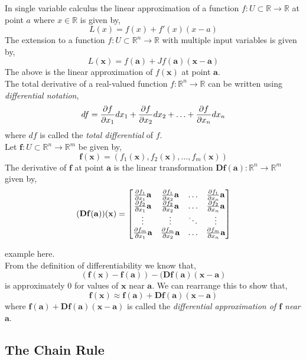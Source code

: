 \documentclass[12pt]{article}
\begin{document}
 In single variable calculus the linear approximation of a function $f:U\subset\mathbb{R}\rightarrow\mathbb{R}$ at point $a$ where $x\in\mathbb{R}$ is given by,
\[
L(x) = f(x) + f'(x)(x-a)
\]
The extension to a function $f:U\subset\mathbb{R}^n\rightarrow\mathbb{R}$ with multiple input variables is given by,
\[
L(\mathbf{x}) = f(\mathbf{a}) + Jf(\mathbf{a})(\mathbf{x}-\mathbf{a})
\]
The above is the linear approximation of $f(\mathbf{x})$ at point $\mathbf{a}$. \\

 The total derivative of a real-valued function $f:\mathbb{R}^n\rightarrow\mathbb{R}$  can be written using \emph{differential notation},
\[
df = \frac{\partial f}{\partial x_1}dx_1 + \frac{\partial f}{\partial x_2}dx_2 + \ldots + \frac{\partial f}{\partial x_n}dx_n
\]
where $df$ is called the \emph{total differential} of $f$. \\

 Let $\mathbf{f}:U\subset\mathbb{R}^n\rightarrow\mathbb{R}^m$ be given by,
\[
\mathbf{f}(\mathbf{x}) = (f_1(\mathbf{x}),f_2(\mathbf{x}),\ldots,f_m(\mathbf{x}))
\]
The derivative of $\mathbf{f}$ at point $\mathbf{a}$ is the linear transformation $\mathbf{Df(a)}:\mathbb{R}^n\rightarrow\mathbb{R}^m$ given by,
\[
\mathbf{(Df(a))(x)} = 
\begin{bmatrix}
\frac{\partial f_1}{\partial x_1}\mathbf{a} & \frac{\partial f_1}{\partial x_2}\mathbf{a} & \ldots & \frac{\partial f_1}{\partial x_n}\mathbf{a} \\
\frac{\partial f_2}{\partial x_1}\mathbf{a} & \frac{\partial f_2}{\partial x_2}\mathbf{a} & \ldots & \frac{\partial f_2}{\partial x_n}\mathbf{a} \\
\vdots & \vdots & \ddots & \vdots \\
\frac{\partial f_m}{\partial x_1}\mathbf{a} & \frac{\partial f_m}{\partial x_2}\mathbf{a} & \ldots & \frac{\partial f_m}{\partial x_n}\mathbf{a} \\
\end{bmatrix}
\]

 {\color{red} example here.} \\

 From the definition of differentiability we know that,
\[
\mathbf{(f(x)-f(a))-(Df(a)(x-a)}
\]
is approximately 0 for values of $\mathbf{x}$ near $\mathbf{a}$. We can rearrange this to show that,
\[
\mathbf{f(x)\approx f(a) + Df(a)(x-a)}
\]
where $\mathbf{f(a) + Df(a)(x-a)}$ is called the \emph{differential approximation of $\mathbf{f}$ near $\mathbf{a}$}. \\

\subsection{The Chain Rule}
\end{document}
